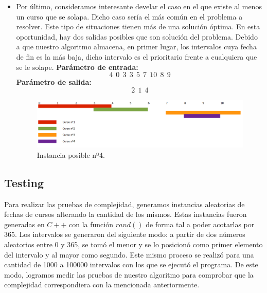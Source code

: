 \begin{itemize}
\item Por último, consideramos interesante develar el caso en el que existe al menos un curso que se solapa. Dicho caso sería el más común en el problema a resolver. Este tipo de situaciones tienen más de una solución óptima. En esta oportunidad, hay dos salidas posibles que son solución del problema. Debido a que nuestro algoritmo almacena, en primer lugar, los intervalos cuya fecha de fin es la más baja, dicho intervalo es el prioritario frente a cualquiera que se le solape.\newline
\textbf{Parámetro de entrada:}  $$4\ \ 0\ \ 3\ \ 3\ \ 5\ \ 7\ \ 10\ \ 8\ \ 9$$
\textbf{Parámetro de salida:}  $$2\ \ 1\ \ 4$$ \newline

\begin{figure}[H] %
\begin{center}
\includegraphics[width=450pt]{../imgs/instancia1.jpg}
\end{center}
\caption{Instancia posible nº4.}
\end{figure}

\end{itemize}

\subsection{Testing}
Para realizar las pruebas de complejidad, generamos instancias aleatorias de fechas de cursos alterando la cantidad de los mismos. Estas instancias fueron generadas en $C++$ con la función $rand()$ de forma tal a poder acotarlas por 365. Los intervalos se generaron del siguiente modo: a partir de dos números aleatorios entre 0 y 365, se tomó el menor y se lo posicionó como primer elemento del intervalo y al mayor como segundo. Este mismo proceso se realizó para una cantidad de 1000 a 100000 intervalos con los que se ejecutó el programa. De este modo, logramos medir las pruebas de nuestro algoritmo para comprobar que la complejidad correspondiera con la mencionada anteriormente.

